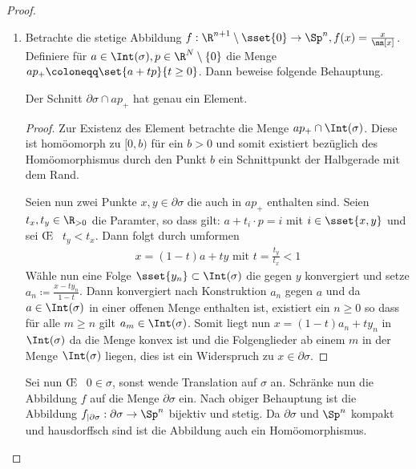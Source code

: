 \begin{Satz}
\begin{proof}
\begin{enumerate}[$a)$:]
    \item Betrachte die stetige Abbildung
      $f : \R^{n+1} \setminus \sset{0} \rightarrow \Sp^n, f(x) = \frac{x}{\nn[x]}$.
      Definiere für $a \in \Int(\sigma), p \in \R^N \setminus \{ 0 \}$ die Menge
      $ap_+ \coloneqq \set{ a + tp}{ t \geq 0}$. Dann beweise folgende Behauptung.
      \begin{Beh}
        Der Schnitt $\partial\sigma \cap ap_+$ hat genau ein Element.
        \begin{proof}
          Zur Existenz des Element betrachte die Menge
          $ap_+ \cap \Int(\sigma)$.  Diese ist homöomorph zu $[0,b)$
          für ein $b>0$ und somit existiert bezüglich des
          Homöomorphismus durch den Punkt $b$ ein Schnittpunkt der
          Halbgerade mit dem Rand.
          
          Seien nun zwei Punkte $x,y \in \partial\sigma$ die auch in
          $ap_+$ enthalten sind. Seien $t_x, t_y \in \R_{> 0}$ die
          Paramter, so dass gilt: $a + t_i \cdot p = i$ mit
          $i \in \sset{x,y}$ und sei \OE~ $t_y < t_x$. Dann folgt
          durch umformen
          \begin{gather*}
            x = (1-t) a + ty \text{ mit } t=\frac{t_y}{t_x} < 1
          \end{gather*}
          Wähle nun eine Folge $\sset{y_n} \subset \Int(\sigma)$ die
          gegen $y$ konvergiert und setze
          $a_n \coloneqq \frac{x -ty_n}{1-t}$. Dann konvergiert nach
          Konstruktion $a_n$ gegen $a$ und da $a \in \Int(\sigma)$ in
          einer offenen Menge enthalten ist, existiert ein $n \geq 0$
          so dass für alle $m \geq n$ gilt $a_m \in \Int(\sigma)$. Somit
          liegt nun $x = (1-t) a_n + ty_n$ in $\Int(\sigma)$ da die
          Menge konvex ist und die Folgenglieder ab einem $m$ in der
          Menge $\Int(\sigma)$ liegen, dies ist ein Widerspruch zu
          $x \in \partial\sigma$.
        \end{proof}
      \end{Beh}
      Sei nun \OE~ $0 \in \sigma$, sonst wende Translation auf
      $\sigma$ an.  Schränke nun die Abbildung $f$ auf die Menge
      $\partial\sigma$ ein. Nach obiger Behauptung ist die Abbildung
      $f_{| \partial\sigma} : \partial\sigma \rightarrow \Sp^n$
      bijektiv und stetig. Da $\partial\sigma$ und $\Sp^n$ kompakt und
      hausdorffsch sind ist die Abbildung auch ein Homöomorphismus.
      

\end{enumerate}
\end{proof}
\end{Satz}
